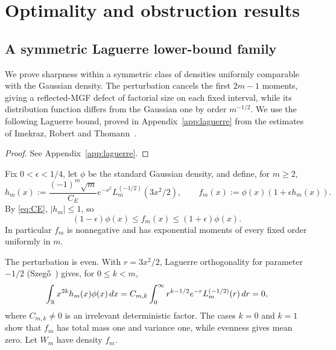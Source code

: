 \section{Optimality and obstruction results}\label{sec:sharpness}

\subsection{A symmetric Laguerre lower-bound family}

We prove sharpness within a symmetric class of densities uniformly comparable with the Gaussian density. The perturbation cancels the first $2m-1$ moments, giving a reflected-MGF defect of factorial size on each fixed interval, while its distribution function differs from the Gaussian one by order $m^{-1/2}$. We use the following Laguerre bound, proved in Appendix~\ref{app:laguerre} from the estimates of Imekraz, Robert and Thomann~\cite[Proposition~3.2]{ImekrazRobertThomann2016}.

\begin{proof}
See Appendix~\ref{app:laguerre}.
\end{proof}

Fix $0<\epsilon<1/4$, let $\phi$ be the standard Gaussian density, and define, for $m\ge2$,
\[
h_m(x):=\frac{(-1)^m\sqrt m}{C_E}
 e^{-x^2}L_m^{(-1/2)}(3x^2/2),
\qquad
f_m(x):=\phi(x)(1+\epsilon h_m(x)).
\]
By \eqref{eq:CE}, $|h_m|\le1$, so
\begin{equation}\label{eq:gaussian-comparable-density}
(1-\epsilon)\phi(x)\le f_m(x)\le(1+\epsilon)\phi(x).
\end{equation}
In particular $f_m$ is nonnegative and has exponential moments of every fixed order uniformly in $m$.

The perturbation is even. With $r=3x^2/2$, Laguerre orthogonality for parameter $-1/2$ (Szeg\H{o}~\cite[Chapter~V]{Szego1975}) gives, for $0\le k<m$,
\[
\int_{\mathbb R}x^{2k}h_m(x)\phi(x)\,dx
=C_{m,k}\int_0^\infty r^{k-1/2}e^{-r}L_m^{(-1/2)}(r)\,dr=0,
\]
where $C_{m,k}\ne0$ is an irrelevant deterministic factor. The cases $k=0$ and $k=1$ show that $f_m$ has total mass one and variance one, while evenness gives mean zero. Let $W_m$ have density $f_m$.

